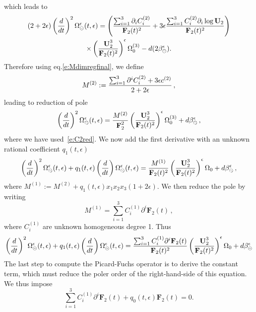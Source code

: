 \documentclass[a4paper,12pt]{article}
\numberwithin{equation}{section}
\numberwithin{figure}{section}
\def\su{\circleddash}
\begin{document}
which leads to 
%
\begin{multline}
 (2+2\epsilon)\left(d\over dt\right)^2
  \Omega_{\su}^{\epsilon}(t,\epsilon)=
 \left({\sum_{i=1}^3 \partial_i C_i^{(2)}\over
     \textbf{F}_2(t)^{2}}+3\epsilon{\sum_{i=1}^3 C_i^{(2)}\partial_i
     \log \textbf{U}_2\over \textbf{F}_2(t)^{2}}\right)\cr \times\left(\textbf{U}_2^3\over \textbf{F}_2(t)^2\right)^\epsilon \Omega_0^{(3)}-d(2\beta_\su^\epsilon).
\end{multline}
%
Therefore using eq.\eqref{e:Mdimregfinal}, we define
\begin{equation}
  \label{e:M2}
  M^{(2)}:={\sum_{i=1}^3 \partial^i  C_i^{(2)}+3\epsilon
    c^{(2)}\over 2+2\epsilon} \,, 
\end{equation}
leading to reduction of pole
\begin{equation}
 \left(d\over dt\right)^2
  \Omega_{\su}^{\epsilon}(t,\epsilon)=
{M^{(2)}\over
     \textbf{F}_2^{2}}\left(\textbf{U}_2^3\over \textbf{F}_2(t)^2\right)^\epsilon \Omega_0^{(3)}+d\beta_\su^\epsilon \, ,
 \end{equation}
where we have used~\eqref{e:C2red}.
%
We now add the first derivative with an unknown rational coefficient $q_1(t,\epsilon)$
\begin{multline}
 \left(d\over dt\right)^2
  \Omega_{\su}^{\epsilon}(t,\epsilon) +q_1(t,\epsilon) \left(d\over dt\right)
  \Omega_{\su}^{\epsilon}(t,\epsilon) =
{M^{(1)}\over
     \textbf{F}_2(t)^{2}}\left(\textbf{U}_2^3\over \textbf{F}_2(t)^2\right)^\epsilon \Omega_0+d\beta_\su^\epsilon \, , 
 \end{multline}
where $M^{(1)}:=M^{(2)}+q_1(t,\epsilon) x_1x_2x_3(1+2\epsilon)$.
 We then reduce the pole by writing
 \begin{equation}\label{e:M2red}
   M^{(1)}= \sum_{i=1}^3
   C_i^{(1)} \partial^i \textbf{F}_2(t) \,, 
 \end{equation}
 where $ C_i^{(1)}$ are unknown homogeneous degree 1.
Thus
\begin{equation}
 \left(d\over dt\right)^2
  \Omega_{\su}^{\epsilon}(t,\epsilon) +q_1(t,\epsilon) \left(d\over dt\right)
  \Omega_{\su}^{\epsilon}(t,\epsilon) =
{ \sum_{i=1}^3
   C_i^{(1)} \partial^i \textbf{F}_2(t)\over
     \textbf{F}_2(t)^{2}}\left(\textbf{U}_2^3\over \textbf{F}_2(t)^2\right)^\epsilon \Omega_0+d\beta_\su^\epsilon
 \end{equation}
%
The last step to compute the Picard-Fuchs operator is to derive the constant term, which must reduce the poler order of the right-hand-side of this equation. We thus impose
\begin{equation}\label{e:c0}
  \sum_{i=1}^3C_i^{(1)}\partial^i \textbf{F}_2(t)+ q_0(t,\epsilon) \textbf{F}_2 (t) =0.
\end{equation}
\end{document}
